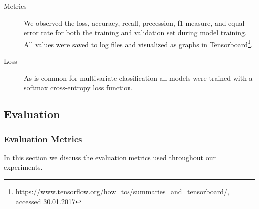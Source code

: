 \begin{description}
	\item[Metrics] We observed the loss, accuracy, recall, precession, f1 measure, and equal error rate for both the training and validation set during model training. All values were saved to log files and visualized as graphs in Tensorboard\footnote{\url{https://www.tensorflow.org/how_tos/summaries_and_tensorboard/}, accessed 30.01.2017}.  
	\item[Loss] As is common for multivariate classification all models were trained with a softmax cross-entropy loss function.
	\end{description}


\subsection{Evaluation} 

\subsubsection{Evaluation Metrics} 
\label{sec:metrics}
In this section we discuss the evaluation metrics used throughout our experiments. 


